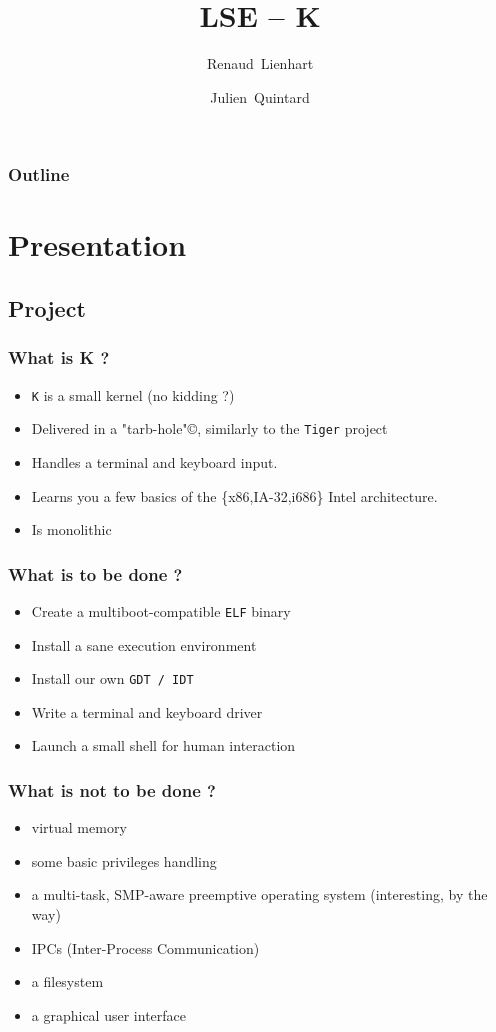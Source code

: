 \documentclass{beamer}
\title{LSE -- K}
\author{Renaud~Lienhart \and Julien~Quintard}
\begin{document}
\begin{frame}
  \titlepage
\end{frame}

\begin{frame}
  \frametitle{Outline}
  \tableofcontents
\end{frame}


\section{Presentation}

\subsection{Project}

\begin{frame}
  \frametitle{What is K ?}

  \begin{itemize}
  \item
    \texttt{K} is a small kernel (no kidding ?)
  \item
    Delivered in a "tarb-hole"\copyright, similarly to the \texttt{Tiger} project
  \item
    Handles a terminal and keyboard input.
  \item
    Learns you a few basics of the \{x86,IA-32,i686\} Intel architecture.
  \item
    Is monolithic
  \end{itemize}
\end{frame}

\begin{frame}
  \frametitle{What is to be done ?}

  \begin{itemize}
  \item
    Create a multiboot-compatible \texttt{ELF} binary
  \item
    Install a sane execution environment
  \item
    Install our own \texttt{GDT / IDT}
  \item
    Write a terminal and keyboard driver
  \item
    Launch a small shell for human interaction
  \end{itemize}
\end{frame}

\begin{frame}
  \frametitle{What is not to be done ?}

  \begin{itemize}
  \item
    virtual memory
  \item
    some basic privileges handling
  \item
    a multi-task, SMP-aware preemptive operating system (interesting, by the way)
  \item
    IPCs (Inter-Process Communication)
  \item
    a filesystem
  \item
    a graphical user interface
  \end{itemize}
\end{frame}
\end{document}
